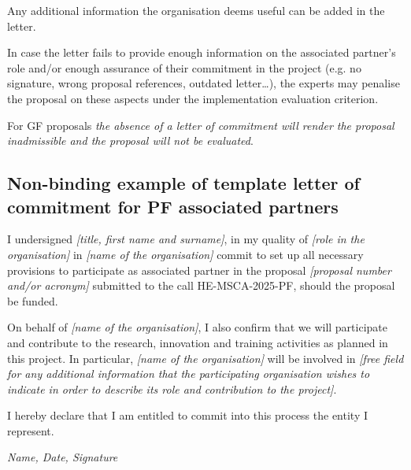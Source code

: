\documentclass[12pt,draftproposal]{msca-pf}
\begin{document}
Any additional information the organisation deems useful can be added in the letter.

In case the letter fails to provide enough information on the associated partner's
role and/or enough assurance of their commitment in the project (e.g. no signature,
wrong proposal references, outdated letter…), the experts may penalise the
proposal on these aspects under the implementation evaluation criterion.

For GF proposals \emph{the absence of a letter of commitment will render the
proposal inadmissible and the proposal will not be evaluated}.

\subsection*{Non-binding example of template letter of commitment for PF associated partners}

I undersigned \emph{[title, first name and surname]}, in my quality of
\emph{[role in the organisation]} in \emph{[name of the organisation]} commit
to set up all necessary provisions to participate as associated partner in the
proposal \emph{[proposal number and/or acronym]} submitted to the call
HE-MSCA-2025-PF, should the proposal be funded.

On behalf of \emph{[name of the organisation]}, I also confirm that we will
participate and contribute to the research, innovation and training activities
as planned in this project. In particular, \emph{[name of the organisation]}
will be involved in \emph{[free field for any additional information that the
participating organisation wishes to indicate in order to describe its role
and contribution to the project]}.

I hereby declare that I am entitled to commit into this process the entity I represent.

\hfill \emph{Name, Date, Signature}
\end{document}
